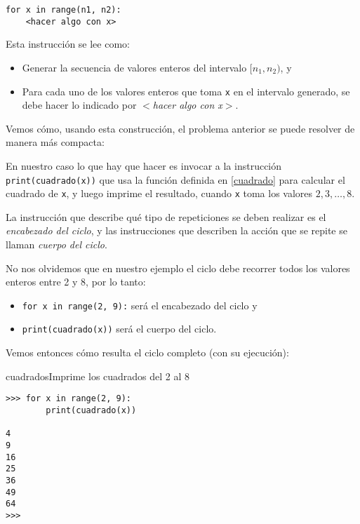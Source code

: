\begin{lstlisting}[numbers=none]
for x in range(n1, n2):
	<hacer algo con x>
\end{lstlisting}

Esta instrucción se lee como:

\begin{itemize}
\item Generar la secuencia de valores enteros del intervalo $[n_1, n_2)$, y
\item Para cada uno de los valores enteros que toma \verb+x+ en el intervalo generado,
se debe hacer lo indicado por {\it $<$hacer algo con x$>$}.
\end{itemize}

Vemos cómo, usando esta construcción, el problema anterior se puede resolver
de manera más compacta:

\begin{solucion} En nuestro caso lo que hay que hacer es invocar a la
instrucción \lstinline!print(cuadrado(x))! que usa la función definida en
\ref{cuadrado} para calcular el cuadrado de \lstinline!x!, y luego imprime el
resultado, cuando \lstinline!x! toma los valores $2, 3, \ldots, 8$.

La instrucción que describe qué tipo de repeticiones se deben
realizar es el {\it encabezado del ciclo}, y las instrucciones que
describen la acción que se repite se llaman {\it cuerpo del
ciclo}.

No nos olvidemos que en nuestro ejemplo el ciclo debe recorrer todos los valores
enteros entre 2 y 8, por lo tanto:

\begin{itemize}
\item \lstinline+for x in range(2, 9):+ será el encabezado del ciclo y
\item \lstinline+print(cuadrado(x))+ será el cuerpo del ciclo.
\end{itemize}

Vemos entonces cómo resulta el ciclo completo (con su ejecución):

\begin{codigo}{cuadrados}{Imprime los cuadrados del 2 al 8}
\begin{lstlisting}[numbers=none]
>>> for x in range(2, 9):
        print(cuadrado(x))

4
9
16
25
36
49
64
>>>
\end{lstlisting}
\end{codigo}
\end{solucion}

